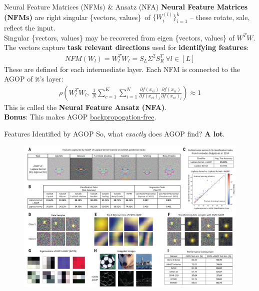 \documentclass{beamer}
\begin{document}
\begin{frame}{Neural Feature Matrices (NFMs) \& Ansatz (NFA)}
	\textbf{Neural Feature Matrices (NFMs)} are right singular \{vectors, values\}~of $\{W_i^{(l)}\}^k_{i=1}$ -- these rotate, sale, reflect the input. \pause \newline \\

	Singular \{vectors, values\} may be recovered from eigen \{vectors, values\} of $W^TW$. \pause The vectors capture \textbf{task relevant directions} used for \textbf{identifying features}:
	\begin{gather}
		NFM(W_l) = W_l^T W_l  = S_L \Sigma^2 S_R^T \ \forall l \in [L]
	\end{gather} \pause
	These are defined for each intermediate layer. \pause Each NFM is connected to the AGOP of it's layer:
	\begin{gather}
		\rho \left(W_l^TW_l,\ \frac{1}{N} \sum^K_{c=1} \sum^N_{i=1} \frac{\partial f(x_{ci})}{\partial f(x_{ci})_l} \frac{\partial f(x_{ci})}{\partial f(x_{ci})_l}\right) \approx 1
	\end{gather}
	This is called the \textbf{Neural Feature Ansatz (NFA)}. \pause \\

	\textbf{Bonus}: This makes AGOP \underline{backpropogation-free}.
\end{frame}

\begin{frame}{Features Identified by AGOP}
	So, what \textit{exactly} does AGOP find? \pause \textbf{A lot}.

	\begin{figure}[H]
		\centering
		\includegraphics[width=.9\textwidth]{img/agop.jpg}
	\end{figure}
\end{frame}
\end{document}
